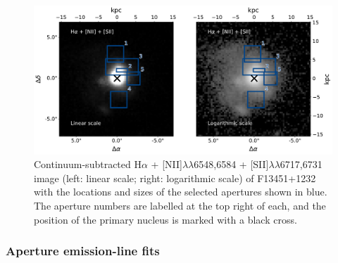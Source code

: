\begin{figure}[!t]
    \centering
    \includegraphics[width=\linewidth, trim={0cm 0 0 0cm}, clip]{figures/muse_f13451_1232/halpha_sii_image_apertures.pdf}
    \caption[Continuum-subtracted H$\alpha$ + {[}NII{]}$\lambda\lambda$6548,6584 + {[}SII{]}$\lambda\lambda$6717,6731 images of F13451+1232, with the locations and sizes of extracted apertures shown.]{Continuum-subtracted H$\alpha$ + [NII]$\lambda\lambda$6548,6584 + [SII]$\lambda\lambda$6717,6731 image (left: linear scale; right: logarithmic scale) of F13451+1232 with the locations and sizes of the selected apertures shown in blue. The aperture numbers are labelled at the top right of each, and the position of the primary nucleus is marked with a black cross.}
    \label{fig: muse_f13451_1232: analysis_and_results: extended_emission: apertures}
\end{figure}

\newpage

\subsubsection{Aperture emission-line fits}
\label{section: muse_f13451_1232: analysis_and_results: extended_emission: aperture_line_fits}

